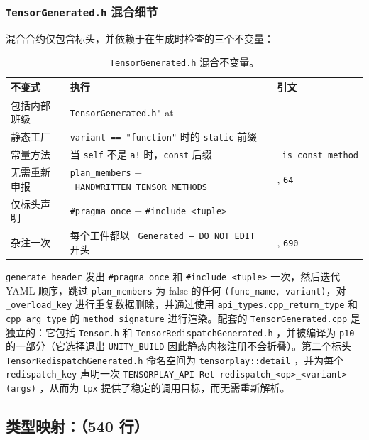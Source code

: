 \subsubsection{\texttt{TensorGenerated.h} 混合细节}

混合合约仅包含标头，并依赖于在生成时检查的三个不变量：

\begin{table}[H]
\centering
\caption{\texttt{TensorGenerated.h} 混合不变量。}
\label{tab:tensorh_mixing}
\small
\begin{tabular}{lll}
\toprule
不变式 & 执行 & 引文 \\
\midrule
包括内部班级 & \texttt{TensorGenerated.h"} at & \\
静态工厂 & \texttt{variant == "function"} 时的 \texttt{static} 前缀 & \\
常量方法 & 当 \texttt{self} 不是 \texttt{a!} 时，\texttt{const} 后缀 & \texttt{\_is\_const\_method} \\
无需重新申报 & \texttt{plan\_members} + \texttt{\_HANDWRITTEN\_TENSOR\_METHODS} & , \texttt{64} \\
仅标头声明 & \texttt{\#pragma once} + \texttt{\#include <tuple>} & \\
杂注一次 & 每个工件都以 \texttt{ Generated -- DO NOT EDIT} 开头 & , \texttt{690} \\
\bottomrule
\end{tabular}
\end{table}

\texttt{generate\_header} 发出 \texttt{\#pragma once} 和 \texttt{\#include <tuple>} 一次，然后迭代 YAML 顺序，跳过 \texttt{plan\_members} 为 false 的任何 \texttt{(func\_name, variant)}，对 \texttt{\_overload\_key} 进行重复数据删除，并通过使用 \texttt{api\_types.cpp\_return\_type} 和 \texttt{cpp\_arg\_type} 的 \texttt{method\_signature} 进行渲染。配套的 \texttt{TensorGenerated.cpp} 是独立的：它包括 \texttt{Tensor.h} 和 \texttt{TensorRedispatchGenerated.h} ，并被编译为 \texttt{p10} 的一部分（它选择退出 \texttt{UNITY\_BUILD} 因此静态内核注册不会折叠）。第二个标头 \texttt{TensorRedispatchGenerated.h} 命名空间为 \texttt{tensorplay::detail} ，并为每个 \texttt{redispatch\_key} 声明一次 \texttt{TENSORPLAY\_API Ret redispatch\_<op>\_<variant>(args)} ，从而为 \texttt{tpx} 提供了稳定的调用目标，而无需重新解析。

\subsection{类型映射：（540 行）}

